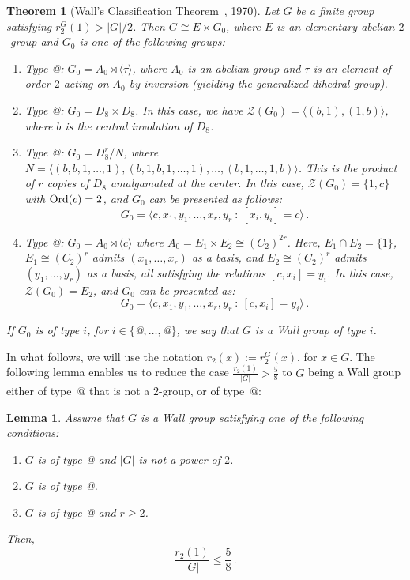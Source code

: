 \documentclass[12pt]{amsart}
\makeatletter
\numberwithin{equation}{section}
\newcommand*{\rom}[1]{\expandafter\@slowromancap\romannumeral #1@}
\newcommand{\Ord}{{\rm Ord}}
\newtheorem{lem}[X]{Lemma}
\newtheorem{thm}[X]{Theorem}
\theoremstyle{definition}
\theoremstyle{remark}
\makeatother
\begin{document}
\begin{thm}[Wall's Classification Theorem~\cite{Wall}, 1970]\label{Wallthm}
    Let $G$ be a finite group satisfying $r_2^G(1) > |G|/2$. Then $G \cong E \times G_0$, where $E$ is an elementary abelian $2$-group and $G_0$ is one of the following groups:
    \begin{enumerate}
        \item \emph{Type \rom{1}:} $G_0 = A_0 \rtimes \langle \tau \rangle$, where $A_0$ is an abelian group and $\tau$ is an element of order $2$ acting on $A_0$ by inversion (yielding the generalized dihedral group).
        \item \emph{Type \rom{2}:} $G_0 = D_8 \times D_8$. In this case, we have $\mathcal{Z}(G_0) = \langle(b,1), (1,b)\rangle$, where $b$ is the central involution of $D_8$.
        \item \emph{Type \rom{3}:} $G_0 = D_8^r/N$, where $N = \langle (b,b,1,\dots,1), (b,1,b,1,\dots,1), \dots, (b,1,\dots,1,b) \rangle$. This is the product of $r$ copies of $D_8$ amalgamated at the center. In this case, $\mathcal{Z}(G_0) = \{1,c\}$ with $\Ord(c)=2$, and $G_0$ can be presented as follows:
        \[ G_0 = \bigl\langle c, x_1, y_1, \dots, x_r, y_r\ :\ [x_i,y_i]=c \bigr\rangle\, . \]
        \item \emph{Type \rom{4}:} $G_0 = A_0 \rtimes \langle c \rangle$ where $A_0 = E_1 \times E_2 \cong (C_2)^{2r}$. Here, $E_1 \cap E_2 = \{1\}$, $E_1 \cong (C_2)^r$ admits $(x_1,\dots,x_r)$ as a basis, and $E_2 \cong (C_2)^r$ admits $(y_1,\dots,y_r)$ as a basis, all satisfying the relations $[c,x_i]=y_i$. In this case, $\mathcal{Z}(G_0) = E_2$, and $G_0$ can be presented as:
        \[ G_0 = \bigl\langle c, x_1, y_1, \dots, x_r, y_r\ :\ [c,x_i]=y_i \bigr\rangle\, . \]
    \end{enumerate}
    If $G_0$ is of type $i$, for $i \in \{$\rom{1}$,\dots,$\rom{4}$\}$, we say that $G$ is a Wall group of type $i$.
\end{thm}
In what follows, we will use the notation $r_2(x):=r_2^G(x)$, for $x\in G$. The following lemma enables us to reduce the case $\frac{r_2(1)}{|G|}>\frac{5}{8}$ to $G$ being a Wall group either of type~\rom{1} that is not a $2$-group, or of type~\rom{3}:
    \begin{lem}\label{wallsquare-rootratio}
        Assume that $G$ is a Wall group satisfying one of the following conditions: \begin{enumerate}
            \item $G$ is of type \rom{1} and $|G|$ is not a power of $2$.
          \item $G$ is of type \rom{2}.
          \item $G$ is of type \rom{4} and $r\ge 2$.
        \end{enumerate}
        Then, \[\frac{r_2(1)}{|G|}\le \frac{5}{8}\, .\]
    \end{lem}
\end{document}
